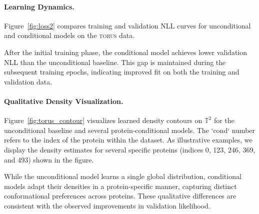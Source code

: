 \documentclass{article}
\begin{document}
\paragraph{Learning Dynamics.}
Figure~\ref{fig:loss2} compares training and validation NLL curves for unconditional and conditional models on the \textsc{torus} data.

{\color{red} After the initial training phase, the conditional model achieves lower
validation NLL than the unconditional baseline.}  This gap is maintained during the subsequent training epochs, indicating
improved fit on both the training and validation data.


\paragraph{Qualitative Density Visualization.}
Figure~\ref{fig:torus_contour} visualizes learned density contours on $\mathbb{T}^2$ for the unconditional baseline and several protein-conditional models. The `cond` number refers to the index of the protein within the dataset. As illustrative examples, we display the density estimates for several specific proteins (indices 0, 123, 246, 369, and 493) shown in the figure.

While the unconditional model learns a single global distribution, conditional models adapt their densities in a protein-specific manner, capturing distinct conformational preferences across proteins. These qualitative differences are consistent with the observed improvements in validation likelihood.
\end{document}
